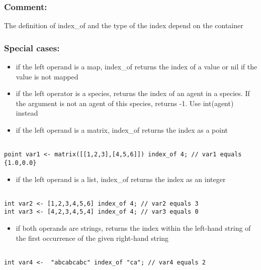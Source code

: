 \documentclass[]{book}
\providecommand{\tightlist}{%
  \setlength{\itemsep}{0pt}\setlength{\parskip}{0pt}}
\theoremstyle{definition}
\theoremstyle{definition}
\theoremstyle{definition}
\theoremstyle{remark}
\begin{document}
\subsubsection{Comment:}\label{comment-52}

The definition of index\_of and the type of the index depend on the
container

\subsubsection{Special cases:}\label{special-cases-79}

\begin{itemize}
\tightlist
\item
  if the left operand is a map, index\_of returns the index of a value
  or nil if the value is not mapped\\
\item
  if the left operator is a species, returns the index of an agent in a
  species. If the argument is not an agent of this species, returns -1.
  Use int(agent) instead\\
\item
  if the left operand is a matrix, index\_of returns the index as a
  point
\end{itemize}

\begin{verbatim}
 
point var1 <- matrix([[1,2,3],[4,5,6]]) index_of 4; // var1 equals {1.0,0.0}
\end{verbatim}

\begin{itemize}
\tightlist
\item
  if the left operand is a list, index\_of returns the index as an
  integer
\end{itemize}

\begin{verbatim}
 
int var2 <- [1,2,3,4,5,6] index_of 4; // var2 equals 3 
int var3 <- [4,2,3,4,5,4] index_of 4; // var3 equals 0
\end{verbatim}

\begin{itemize}
\tightlist
\item
  if both operands are strings, returns the index within the left-hand
  string of the first occurrence of the given right-hand string
\end{itemize}

\begin{verbatim}
 
int var4 <-  "abcabcabc" index_of "ca"; // var4 equals 2
\end{verbatim}
\end{document}
